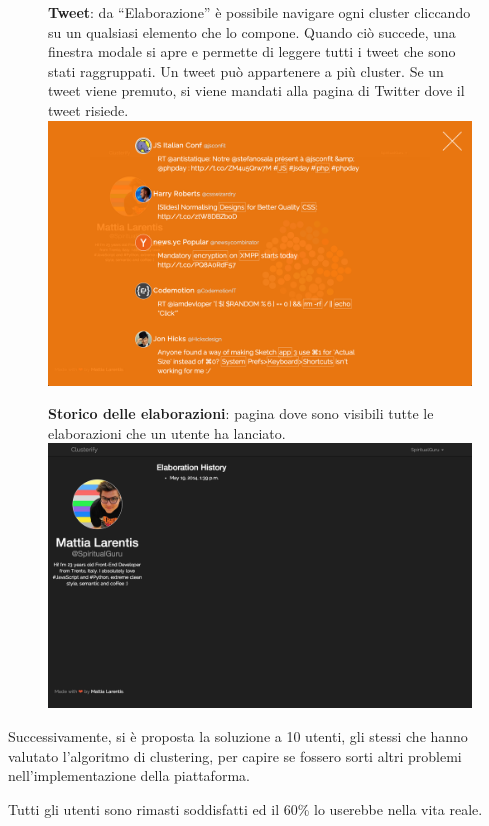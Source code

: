         	\begin{figure}[p]
		\textbf{Tweet}: da ``Elaborazione'' è possibile navigare ogni cluster cliccando su un qualsiasi elemento che lo compone. Quando ciò succede, una finestra modale si apre e permette di leggere tutti i tweet che sono stati raggruppati. Un tweet può appartenere a più cluster. Se un tweet viene premuto, si viene mandati alla pagina di Twitter dove il tweet risiede.\\

        		\includegraphics[width=\textwidth]{img/clusterify/tweet.png}
        	\end{figure}
        
        	\begin{figure}[p]
		\textbf{Storico delle elaborazioni}: pagina dove sono visibili tutte le elaborazioni che un utente ha lanciato.\\

        		\includegraphics[width=\textwidth]{img/clusterify/history.png}
        	\end{figure}            
	
	\newpage
	Successivamente, si è proposta la soluzione a 10 utenti, gli stessi che hanno valutato l'algoritmo di clustering, per capire se fossero sorti altri problemi nell'implementazione della piattaforma. 

	Tutti gli utenti sono rimasti soddisfatti ed il 60\% lo userebbe nella vita reale.


